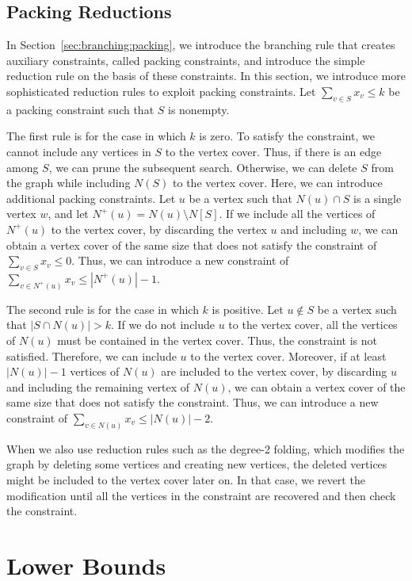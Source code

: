 \documentclass[11pt]{article}
\begin{document}
\subsection{Packing Reductions}\label{sec:reduction:packing}
In Section~\ref{sec:branching:packing}, we introduce the branching rule that creates auxiliary constraints, called
packing constraints, and introduce the simple reduction rule on the basis of these constraints.
In this section, we introduce more sophisticated reduction rules to exploit packing constraints.
Let $\sum_{v\in S}x_v\leq k$ be a packing constraint such that $S$ is nonempty.

The first rule is for the case in which $k$ is zero.
To satisfy the constraint, we cannot include any vertices in $S$ to the vertex cover.
Thus, if there is an edge among $S$, we can prune the subsequent search.
Otherwise, we can delete $S$ from the graph while including $N(S)$ to the vertex cover.
Here, we can introduce additional packing constraints.
Let $u$ be a vertex such that $N(u)\cap S$ is a single vertex $w$, and let $N^+(u)=N(u)\setminus N[S]$.
If we include all the vertices of $N^+(u)$ to the vertex cover, by discarding the vertex $u$ and including
$w$, we can obtain a vertex cover of the same size that does not satisfy the constraint of $\sum_{v\in S}x_v\leq 0$.
Thus, we can introduce a new constraint of $\sum_{v\in N^+(u)}x_v\leq |N^+(u)|-1$.

The second rule is for the case in which $k$ is positive.
Let $u\not\in S$ be a vertex such that $|S\cap N(u)|>k$.
If we do not include $u$ to the vertex cover, all the vertices of $N(u)$ must be contained in the vertex cover.
Thus, the constraint is not satisfied.
Therefore, we can include $u$ to the vertex cover.
Moreover, if at least $|N(u)|-1$ vertices of $N(u)$ are included to the vertex cover, by discarding $u$ and including
the remaining vertex of $N(u)$, we can obtain a vertex cover of the same size that does not satisfy the constraint.
Thus, we can introduce a new constraint of $\sum_{v\in N(u)}x_v\leq |N(u)|-2$.

When we also use reduction rules such as the degree-2 folding, which modifies the graph by deleting some vertices
and creating new vertices, the deleted vertices might be included to the vertex cover later on.
In that case, we revert the modification until all the vertices in the constraint are recovered and then check the
constraint.
 \section{Lower Bounds}\label{sec:lower_bounds}
\end{document}

